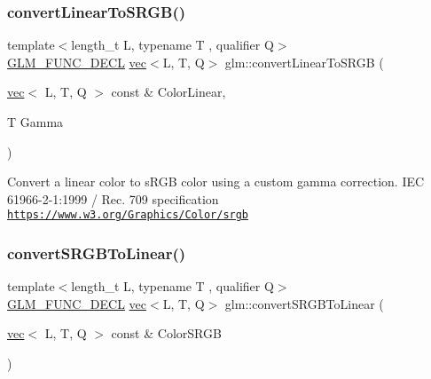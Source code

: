 \subsubsection{\texorpdfstring{convert\+Linear\+To\+S\+R\+G\+B()}{convertLinearToSRGB()}\hspace{0.1cm}{\footnotesize\ttfamily [2/2]}}
{\footnotesize\ttfamily template$<$length\+\_\+t L, typename T , qualifier Q$>$ \\
\hyperlink{setup_8hpp_ab2d052de21a70539923e9bcbf6e83a51}{G\+L\+M\+\_\+\+F\+U\+N\+C\+\_\+\+D\+E\+CL} \hyperlink{structglm_1_1vec}{vec}$<$L, T, Q$>$ glm\+::convert\+Linear\+To\+S\+R\+GB (\begin{DoxyParamCaption}\item[{\hyperlink{structglm_1_1vec}{vec}$<$ L, T, Q $>$ const \&}]{Color\+Linear,  }\item[{T}]{Gamma }\end{DoxyParamCaption})}

Convert a linear color to s\+R\+GB color using a custom gamma correction. I\+EC 61966-\/2-\/1\+:1999 / Rec. 709 specification \href{https://www.w3.org/Graphics/Color/srgb}{\tt https\+://www.\+w3.\+org/\+Graphics/\+Color/srgb} \mbox{\label{group__gtc__color__space_ga16c798b7a226b2c3079dedc55083d187}} 
\subsubsection{\texorpdfstring{convert\+S\+R\+G\+B\+To\+Linear()}{convertSRGBToLinear()}\hspace{0.1cm}{\footnotesize\ttfamily [1/2]}}
{\footnotesize\ttfamily template$<$length\+\_\+t L, typename T , qualifier Q$>$ \\
\hyperlink{setup_8hpp_ab2d052de21a70539923e9bcbf6e83a51}{G\+L\+M\+\_\+\+F\+U\+N\+C\+\_\+\+D\+E\+CL} \hyperlink{structglm_1_1vec}{vec}$<$L, T, Q$>$ glm\+::convert\+S\+R\+G\+B\+To\+Linear (\begin{DoxyParamCaption}\item[{\hyperlink{structglm_1_1vec}{vec}$<$ L, T, Q $>$ const \&}]{Color\+S\+R\+GB }\end{DoxyParamCaption})}

